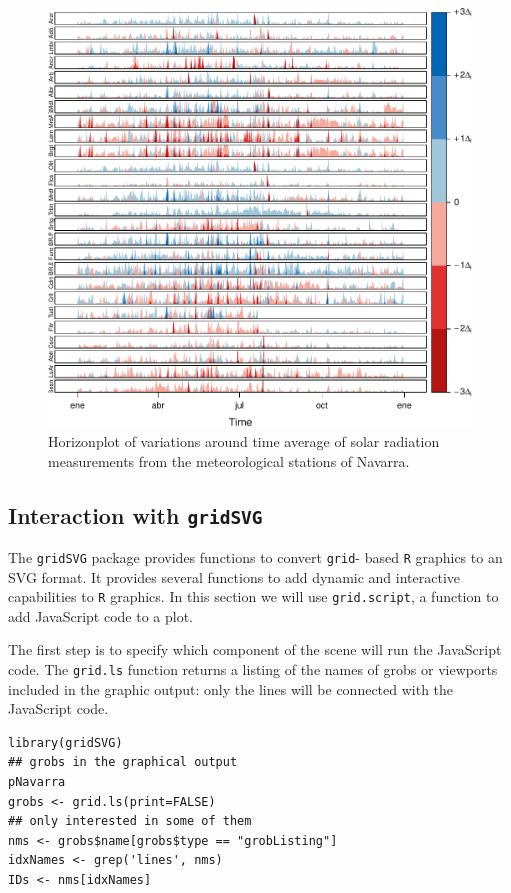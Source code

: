 \begin{figure}[htb]
\centering
\includegraphics[width=.9\linewidth]{figs/navarraHorizonplot.pdf}
\caption{\label{fig:navarraHorizonplot}Horizonplot of variations around time average of solar radiation measurements from the meteorological stations of Navarra.}
\end{figure}
\subsection{Interaction with \texttt{gridSVG}}
\label{sec-1-2}


The \texttt{gridSVG} package provides functions to convert \texttt{grid}-
based \texttt{R} graphics to an SVG format. It provides several functions
to add dynamic and interactive capabilities to \texttt{R} graphics. In
this section we will use \texttt{grid.script}, a function to add
JavaScript code to a plot.

The first step is to specify which component of the scene
will run the JavaScript code. The \texttt{grid.ls} function  returns a
listing of the names of grobs or viewports included in the graphic
output: only the lines will be connected with the JavaScript
code. 


\lstset{language=R}
\begin{lstlisting}
library(gridSVG)
## grobs in the graphical output
pNavarra
grobs <- grid.ls(print=FALSE)
## only interested in some of them
nms <- grobs$name[grobs$type == "grobListing"]
idxNames <- grep('lines', nms)
IDs <- nms[idxNames]
\end{lstlisting}


